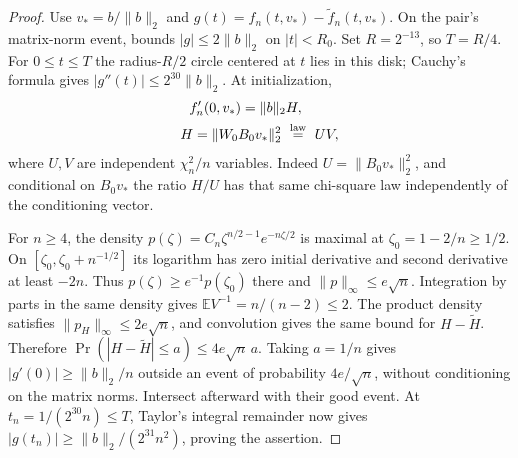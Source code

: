 \begin{proof}
Use \(v_*=b/\|b\|_2\) and \(g(t)=f_n(t,v_*)-\widetilde f_n(t,v_*)\). On
the pair's matrix-norm event, 
bounds \(|g|\le2\|b\|_2\) on \(|t|<R_0\). Set \(R=2^{-13}\), so
\(T=R/4\). For \(0\le t\le T\) the radius-\(R/2\) circle centered at
\(t\) lies in this disk; Cauchy's formula gives
\(|g''(t)|\le2^{30}\|b\|_2\). At initialization, \[\begin{gathered}
f_n'(0,v_*)=\|b\|_2 H,\qquad\\
H=\|W_0B_0v_*\|_2^2\ \stackrel{\rm law}{=}\ UV,
\end{gathered}\] where \(U,V\) are independent \(\chi_n^2/n\) variables.
Indeed \(U=\|B_0v_*\|_2^2\), and conditional on \(B_0v_*\) the ratio
\(H/U\) has that same chi-square law independently of the conditioning
vector.

For \(n\ge4\), the density \(p(\zeta)=C_n\zeta^{n/2-1}e^{-n\zeta/2}\) is maximal at
\(\zeta_0=1-2/n\ge1/2\). On \([\zeta_0,\zeta_0+n^{-1/2}]\) its logarithm has zero
initial derivative and second derivative at least \(-2n\). Thus
\(p(\zeta)\ge e^{-1}p(\zeta_0)\) there and \(\|p\|_\infty\le e\sqrt n\).
Integration by parts in the same density gives
\(\mathbb E V^{-1}=n/(n-2)\le2\). The product density satisfies
\(\|p_H\|_\infty\le2e\sqrt n\), and convolution gives the same bound for
\(H-\widetilde H\). Therefore
\(\Pr(|H-\widetilde H|\le a)\le4e\sqrt n\,a\). Taking \(a=1/n\) gives
\(|g'(0)|\ge\|b\|_2/n\) outside an event of probability \(4e/\sqrt n\),
without conditioning on the matrix norms. Intersect afterward with their
good event. At \(t_n=1/(2^{30}n)\le T\), Taylor's integral remainder now
gives \(|g(t_n)|\ge\|b\|_2/(2^{31}n^2)\), proving the assertion.
\end{proof}

\label{cp:nth:proof:main}{}

